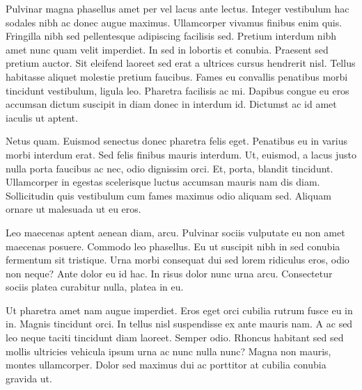 \documentclass[twocol]{ametsocV5}
\begin{document}
Pulvinar magna phasellus amet per vel lacus ante lectus. Integer
vestibulum hac sodales nibh ac donec augue maximus. Ullamcorper vivamus
finibus enim quis. Fringilla nibh sed pellentesque adipiscing facilisis
sed. Pretium interdum nibh amet nunc quam velit imperdiet. In sed in
lobortis et conubia. Praesent sed pretium auctor. Sit eleifend laoreet
sed erat a ultrices cursus hendrerit nisl. Tellus habitasse aliquet
molestie pretium faucibus. Fames eu convallis penatibus morbi tincidunt
vestibulum, ligula leo. Pharetra facilisis ac mi. Dapibus congue eu eros
accumsan dictum suscipit in diam donec in interdum id. Dictumst ac id
amet iaculis ut aptent.

Netus quam. Euismod senectus donec pharetra felis eget. Penatibus eu in
varius morbi interdum erat. Sed felis finibus mauris interdum. Ut,
euismod, a lacus justo nulla porta faucibus ac nec, odio dignissim orci.
Et, porta, blandit tincidunt. Ullamcorper in egestas scelerisque luctus
accumsan mauris nam dis diam. Sollicitudin quis vestibulum cum fames
maximus odio aliquam sed. Aliquam ornare ut malesuada ut eu eros.

Leo maecenas aptent aenean diam, arcu. Pulvinar sociis vulputate eu non
amet maecenas posuere. Commodo leo phasellus. Eu ut suscipit nibh in sed
conubia fermentum sit tristique. Urna morbi consequat dui sed lorem
ridiculus eros, odio non neque? Ante dolor eu id hac. In risus dolor
nunc urna arcu. Consectetur sociis platea curabitur nulla, platea in eu.

Ut pharetra amet nam augue imperdiet. Eros eget orci cubilia rutrum
fusce eu in in. Magnis tincidunt orci. In tellus nisl suspendisse ex
ante mauris nam. A ac sed leo neque taciti tincidunt diam laoreet.
Semper odio. Rhoncus habitant sed sed mollis ultricies vehicula ipsum
urna ac nunc nulla nunc? Magna non mauris, montes ullamcorper. Dolor sed
maximus dui ac porttitor at cubilia conubia gravida ut.
\end{document}
